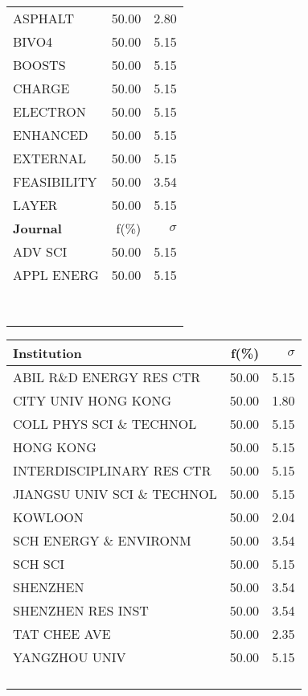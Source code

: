 \documentclass[a4paper,11pt]{report}
\begin{document}
\begin{landscape}
\begin{table}[!ht]
{\begin{tabular}{|p{5cm} r r|}
ASPHALT & 50.00 & 2.80\\
BIVO4 & 50.00 & 5.15\\
BOOSTS & 50.00 & 5.15\\
CHARGE & 50.00 & 5.15\\
ELECTRON & 50.00 & 5.15\\
ENHANCED & 50.00 & 5.15\\
EXTERNAL & 50.00 & 5.15\\
FEASIBILITY & 50.00 & 3.54\\
LAYER & 50.00 & 5.15\\
\hline
{\bf Journal }& f(\%) & $\sigma$\\
\hline
ADV SCI & 50.00 & 5.15\\
APPL ENERG & 50.00 & 5.15\\
 &  & \\
 &  & \\
 &  & \\
 &  & \\
 &  & \\
 &  & \\
 &  & \\
 &  & \\
\hline
\end{tabular}
}
{\scriptsize\begin{tabular}{|p{5cm} r r|}
\hline
{\bf Institution }& f(\%) & $\sigma$\\
\hline
ABIL R\&D ENERGY RES CTR & 50.00 & 5.15\\
CITY UNIV HONG KONG & 50.00 & 1.80\\
COLL PHYS SCI \& TECHNOL & 50.00 & 5.15\\
HONG KONG & 50.00 & 5.15\\
INTERDISCIPLINARY RES CTR & 50.00 & 5.15\\
JIANGSU UNIV SCI \& TECHNOL & 50.00 & 5.15\\
KOWLOON & 50.00 & 2.04\\
SCH ENERGY \& ENVIRONM & 50.00 & 3.54\\
SCH SCI & 50.00 & 5.15\\
SHENZHEN & 50.00 & 3.54\\
SHENZHEN RES INST & 50.00 & 3.54\\
TAT CHEE AVE & 50.00 & 2.35\\
YANGZHOU UNIV & 50.00 & 5.15\\
 &  & \\
 &  & \\
 &  & \\
 &  & \\

\end{tabular}}
\end{table}
\end{landscape}
\end{document}
